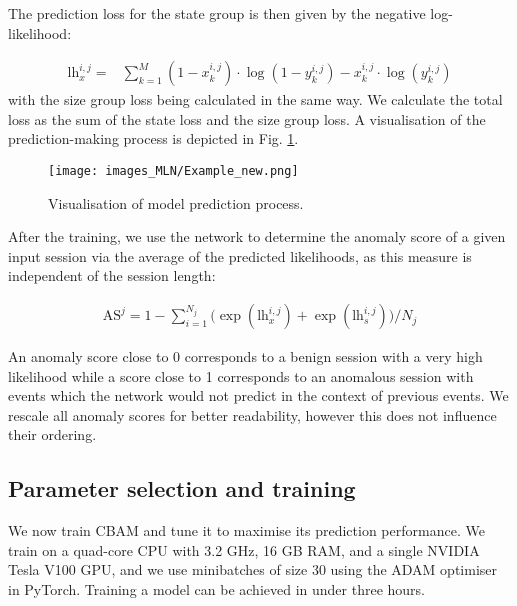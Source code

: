 The prediction loss for the state group is then given by the negative log-likelihood:

\begin{align*}
\text{lh}_x^{i,j}=&\sum_{k=1}^{M}(1-x^{i,j}_{k})\cdot\log(1-y^{i,j}_{k})-x^{i,j}_{k}\cdot\log(y^{i,j}_{k})\nonumber
\end{align*}
with the size group loss being calculated in the same way. We calculate the total loss as the sum of the state loss and the size group loss. A visualisation of the prediction-making process is depicted in Fig. \ref{fig:Modelpred}.



\begin{figure}
\centering
\texttt{[image: images\_MLN/Example\_new.png]} 
\caption{Visualisation of model prediction process.}\label{fig:Modelpred}
\end{figure}


After the training, we use the network to determine the anomaly score of a given input session via the average of the predicted likelihoods, as this measure is independent of the session length: 

\begin{align*}
\text{AS}^j=1-\sum_{i=1}^{N_j}\Big(\exp(\text{lh}_x^{i,j})+\exp(\text{lh}_s^{i,j})\Big)/N_j
\end{align*}

An anomaly score close to 0 corresponds to a benign session with a very high likelihood while a score close to 1 corresponds to an anomalous session with events which the network would not predict in the context of previous events. We rescale all anomaly scores for better readability, however this does not influence their ordering.


\subsection{Parameter selection and training}

We now train CBAM and tune it to maximise its prediction performance. We train on a quad-core CPU with 3.2 GHz, 16 GB RAM, and a single NVIDIA Tesla V100 GPU, and we use minibatches of size 30 using the ADAM optimiser in PyTorch. Training a model can be achieved in under three hours.

